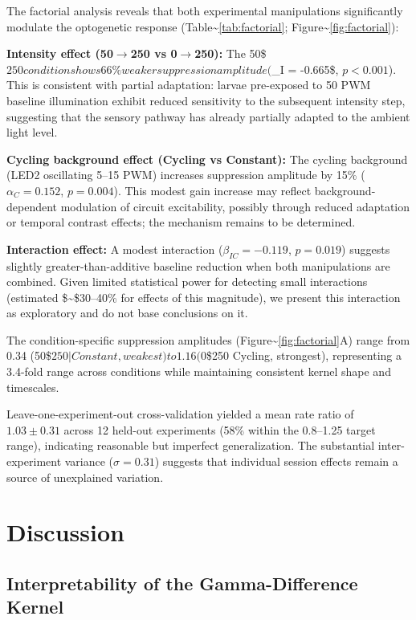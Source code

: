 \documentclass[
  11pt,
  letterpaper,
]{article}
\begin{document}
The factorial analysis reveals that both experimental manipulations
significantly modulate the optogenetic response
(Table\textasciitilde{}\ref{tab:factorial};
Figure\textasciitilde{}\ref{fig:factorial}):

\textbf{Intensity effect (50$\rightarrow$250 vs 0$\rightarrow$250):} The
50\$\rightarrow\(250 condition shows 66\% weaker suppression amplitude (\)\alpha\_I
= -0.665\$, \(p < 0.001\)). This is consistent with partial adaptation:
larvae pre-exposed to 50 PWM baseline illumination exhibit reduced
sensitivity to the subsequent intensity step, suggesting that the
sensory pathway has already partially adapted to the ambient light
level.

\textbf{Cycling background effect (Cycling vs Constant):} The cycling
background (LED2 oscillating 5--15 PWM) increases suppression amplitude
by 15\% (\(\alpha_C = 0.152\), \(p = 0.004\)). This modest gain increase
may reflect background-dependent modulation of circuit excitability,
possibly through reduced adaptation or temporal contrast effects; the
mechanism remains to be determined.

\textbf{Interaction effect:} A modest interaction
(\(\beta_{IC} = -0.119\), \(p = 0.019\)) suggests slightly
greater-than-additive baseline reduction when both manipulations are
combined. Given limited statistical power for detecting small
interactions (estimated \$\sim\$30--40\% for effects of this magnitude),
we present this interaction as exploratory and do not base conclusions
on it.

The condition-specific suppression amplitudes
(Figure\textasciitilde{}\ref{fig:factorial}A) range from 0.34
(50\$\rightarrow\(250 | Constant, weakest) to 1.16 (0\)\rightarrow\$250
\textbar{} Cycling, strongest), representing a 3.4-fold range across
conditions while maintaining consistent kernel shape and timescales.

Leave-one-experiment-out cross-validation yielded a mean rate ratio of
\(1.03 \pm 0.31\) across 12 held-out experiments (58\% within the
0.8--1.25 target range), indicating reasonable but imperfect
generalization. The substantial inter-experiment variance
(\(\sigma = 0.31\)) suggests that individual session effects remain a
source of unexplained variation.

\section{Discussion}

\subsection{Interpretability of the Gamma-Difference Kernel}
\end{document}
